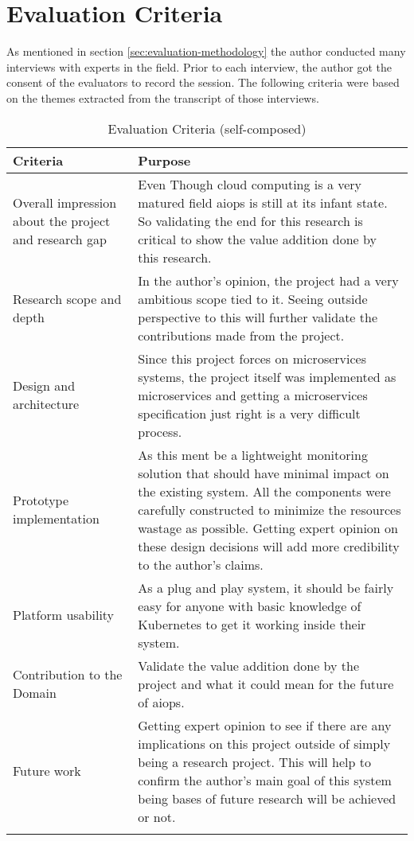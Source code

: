 \section{Evaluation Criteria}

As mentioned in section \ref{sec:evaluation-methodology} the author conducted many interviews with experts in the field. Prior to each interview, the author got the consent of the evaluators to record the session. The following criteria were based on the themes extracted from the transcript of those interviews.

\begin{longtable}{|p{35mm}|p{125mm}|}
    \hline
    \textbf{Criteria} &
    \textbf{Purpose} \\ \hline
    Overall impression about the project and research gap &
        Even Though cloud computing is a very matured field \ac{aiops} is still at its infant state. So validating the end for this research is critical to show the value addition done by this research. \\ \hline
    Research scope and depth &
        In the author's opinion, the project had a very ambitious scope tied to it. Seeing outside perspective to this will further validate the contributions made from the project. \\ \hline
    Design and architecture &
        Since this project forces on microservices systems, the project itself was implemented as microservices and getting a microservices specification just right is a very difficult process. \\ \hline
    Prototype implementation &
        As this ment be a lightweight monitoring solution that should have minimal impact on the existing system. All the components were carefully constructed to minimize the resources wastage as possible. Getting expert opinion on these design decisions will add more credibility to the author's claims. \\ \hline
    Platform usability &
        As a plug and play system, it should be fairly easy for anyone with basic knowledge of Kubernetes to get it working inside their system. \\ \hline
    Contribution to the Domain &
        Validate the value addition done by the project and what it could mean for the future of \ac{aiops}. \\ \hline
    Future work &
        Getting expert opinion to see if there are any implications on this project outside of simply being a research project. This will help to confirm the author’s main goal of this system being bases of future research will be achieved or not. \\ \hline
  
    \caption{Evaluation Criteria (self-composed)}
\end{longtable}